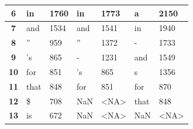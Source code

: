 \documentclass[8pt,a4paper]{report}%
\begin{document}
\begin{table}[H]
\begin{tabular}{|c|l|l|l|l|l|l|}
\textbf{6}                      & in                                      & 1760                                    & in                                       & 1773                                     & a                                       & 2150                                    \\ \hline
\textbf{7}                      & and                                     & 1534                                    & and                                      & 1541                                     & in                                      & 1940                                    \\ \hline
\textbf{8}                      & ''                                      & 959                                     & ''                                       & 1372                                     & -                                       & 1733                                    \\ \hline
\textbf{9}                      & 's                                      & 865                                     & -                                        & 1231                                     & and                                     & 1549                                    \\ \hline
\textbf{10}                     & for                                     & 851                                     & 's                                       & 865                                      & s                                       & 1356                                    \\ \hline
\textbf{11}                     & that                                    & 848                                     & for                                      & 851                                      & for                                     & 870                                     \\ \hline
\textbf{12}                     & \$                                      & 708                                     & NaN                                      & \textless{}NA\textgreater{}              & that                                    & 848                                     \\ \hline
\textbf{13}                     & is                                      & 672                                     & NaN                                      & \textless{}NA\textgreater{}              & NaN                                     & \textless{}NA\textgreater{}             \\ \hline
\end{tabular}
\end{table}
\end{document}
